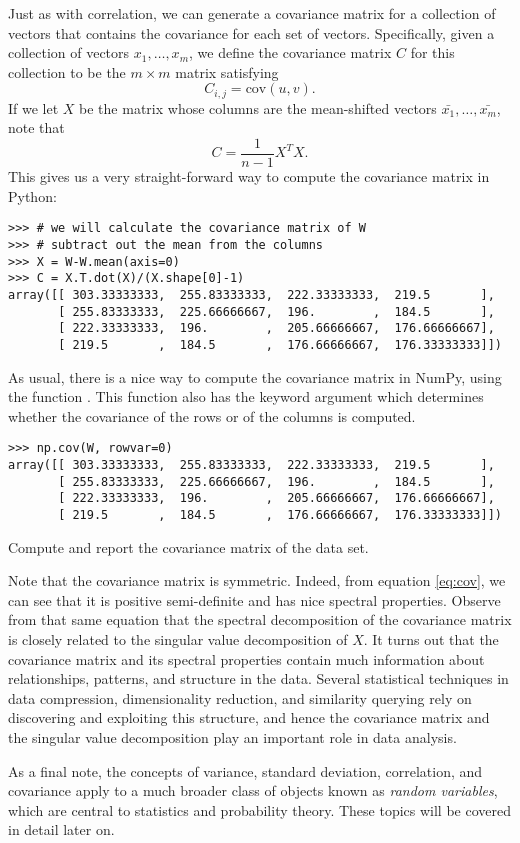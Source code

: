 Just as with correlation, we can generate a covariance matrix for a collection of vectors that contains the covariance for each set of vectors.
Specifically, given a collection of vectors $x_1,\ldots, x_m$, we define the covariance matrix $C$ for this collection to be the $m \times m$ matrix satisfying
\[
C_{i,j} = \text{cov}(u,v).
\]
If we let $X$ be the matrix whose columns are the mean-shifted vectors $\bar{x_1}, \ldots, \bar{x_m}$, note that
\begin{equation}
C = \frac{1}{n-1}X^TX.
\label{eq:cov}
\end{equation}
This gives us a very straight-forward way to compute the covariance matrix in Python:
\begin{lstlisting}
>>> # we will calculate the covariance matrix of W
>>> # subtract out the mean from the columns
>>> X = W-W.mean(axis=0)
>>> C = X.T.dot(X)/(X.shape[0]-1)
array([[ 303.33333333,  255.83333333,  222.33333333,  219.5       ],
       [ 255.83333333,  225.66666667,  196.        ,  184.5       ],
       [ 222.33333333,  196.        ,  205.66666667,  176.66666667],
       [ 219.5       ,  184.5       ,  176.66666667,  176.33333333]])
\end{lstlisting}
As usual, there is a nice way to compute the covariance matrix in NumPy, using the function . This function
also has the keyword argument  which determines whether the covariance of the rows or of the columns is computed.
\begin{lstlisting}
>>> np.cov(W, rowvar=0)
array([[ 303.33333333,  255.83333333,  222.33333333,  219.5       ],
       [ 255.83333333,  225.66666667,  196.        ,  184.5       ],
       [ 222.33333333,  196.        ,  205.66666667,  176.66666667],
       [ 219.5       ,  184.5       ,  176.66666667,  176.33333333]])
\end{lstlisting}

\begin{problem}
Compute and report the covariance matrix of the  data set. 
\end{problem}

Note that the covariance matrix is symmetric. 
Indeed, from equation \ref{eq:cov}, we can see that it is positive semi-definite and has nice spectral properties.
Observe from that same equation that the spectral decomposition of the covariance matrix is closely related to the singular value decomposition of $X$.
It turns out that the covariance matrix and its spectral properties contain much information about relationships, patterns, and structure in the data. 
Several statistical techniques in data compression, dimensionality reduction, and similarity querying rely on discovering and exploiting this structure,
and hence the covariance matrix and the singular value decomposition play an important role in data analysis. 

As a final note, the concepts of variance, standard deviation, correlation, and covariance apply to a much broader class of objects
known as \emph{random variables}, which are central to statistics and probability theory. These topics will be
covered in detail later on.
